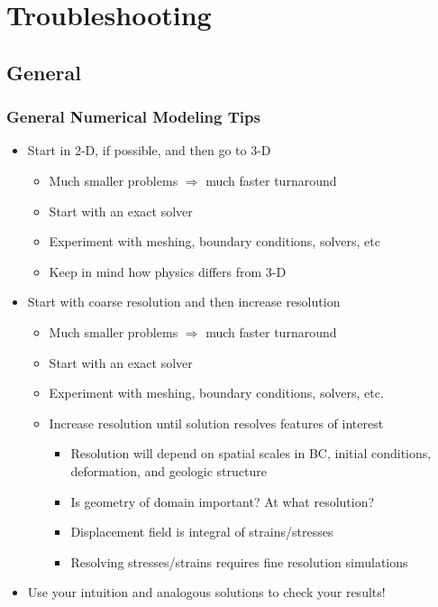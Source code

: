 \documentclass{beamer}
\newcommand{\important}[1]{{\color{red}#1}}
\begin{document}
\section{Troubleshooting}
\subsection{General}

\begin{frame}
  \frametitle{General Numerical Modeling Tips}
  
  \begin{itemize}
  \item \important{Start in 2-D, if possible, and then go to 3-D}
    \begin{itemize}
    \item Much smaller problems $\Rightarrow$ much faster turnaround
    \item Start with an exact solver
    \item Experiment with meshing, boundary conditions, solvers, etc
    \item Keep in mind how physics differs from 3-D
    \end{itemize}
  \item \important{Start with coarse resolution and then increase resolution}
    \begin{itemize}
    \item Much smaller problems $\Rightarrow$ much faster turnaround
    \item Start with an exact solver
    \item Experiment with meshing, boundary conditions, solvers, etc.
    \item Increase resolution until solution resolves features of interest
      \begin{itemize}
      \item Resolution will depend on spatial scales in BC, initial
        conditions, deformation, and geologic structure
      \item Is geometry of domain important? At what resolution?
      \item Displacement field is integral of strains/stresses
      \item Resolving stresses/strains requires fine resolution simulations
      \end{itemize}
    \end{itemize}
  \item \important{Use your intuition and analogous solutions to check
      your results!}
  \end{itemize}
  
\end{frame}
\end{document}
